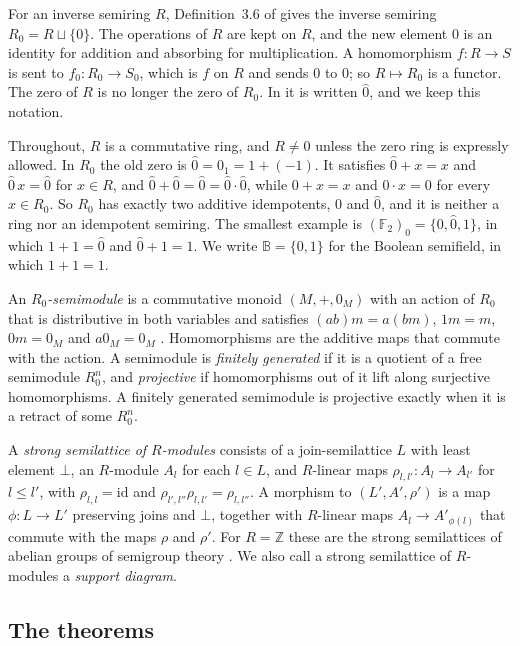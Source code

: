 \documentclass[11pt]{amsart}
\theoremstyle{remark}
\newcommand{\B}{\mathbb B}
\newcommand{\oz}{\widehat{0}}
\begin{document}
For an inverse semiring $R$, Definition~3.6 of \cite{FGJM} gives the inverse semiring $R_0=R\sqcup\{0\}$. The operations of $R$ are kept on $R$, and the new element $0$ is an identity for addition and absorbing for multiplication. A homomorphism $f\colon R\to S$ is sent to $f_0\colon R_0\to S_0$, which is $f$ on $R$ and sends $0$ to $0$; so $R\mapsto R_0$ is a functor. The zero of $R$ is no longer the zero of $R_0$. In \cite{FGJM} it is written $\oz$, and we keep this notation.

Throughout, $R$ is a commutative ring, and $R\ne0$ unless the zero ring is expressly allowed. In $R_0$ the old zero is $\oz=0_1=1+(-1)$. It satisfies $\oz+x=x$ and $\oz\,x=\oz$ for $x\in R$, and $\oz+\oz=\oz=\oz\cdot\oz$, while $0+x=x$ and $0\cdot x=0$ for every $x\in R_0$. So $R_0$ has exactly two additive idempotents, $0$ and $\oz$, and it is neither a ring nor an idempotent semiring. The smallest example is $(\mathbb F_2)_0=\{0,\oz,1\}$, in which $1+1=\oz$ and $\oz+1=1$. We write $\B=\{0,1\}$ for the Boolean semifield, in which $1+1=1$.

An \emph{$R_0$-semimodule} is a commutative monoid $(M,+,0_M)$ with an action of $R_0$ that is distributive in both variables and satisfies $(ab)m=a(bm)$, $1m=m$, $0m=0_M$ and $a0_M=0_M$ \cite[Definition 2.13]{FGJM}. Homomorphisms are the additive maps that commute with the action. A semimodule is \emph{finitely generated} if it is a quotient of a free semimodule $R_0^n$, and \emph{projective} if homomorphisms out of it lift along surjective homomorphisms. A finitely generated semimodule is projective exactly when it is a retract of some $R_0^n$.

A \emph{strong semilattice of $R$-modules} consists of a join-semilattice $L$ with least element $\bot$, an $R$-module $A_l$ for each $l\in L$, and $R$-linear maps $\rho_{l,l'}\colon A_l\to A_{l'}$ for $l\le l'$, with $\rho_{l,l}=\mathrm{id}$ and $\rho_{l',l''}\rho_{l,l'}=\rho_{l,l''}$. A morphism to $(L',A',\rho')$ is a map $\phi\colon L\to L'$ preserving joins and $\bot$, together with $R$-linear maps $A_l\to A'_{\phi(l)}$ that commute with the maps $\rho$ and $\rho'$. For $R=\mathbb Z$ these are the strong semilattices of abelian groups of semigroup theory \cite[Ch.~4]{Howie}. We also call a strong semilattice of $R$-modules a \emph{support diagram}.

\subsection{The theorems}
\end{document}
